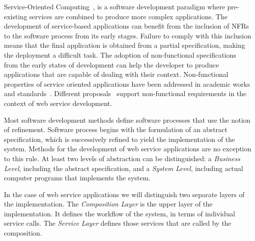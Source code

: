 {Service-Oriented Computing~\cite{Papazoglou2007}, is a software development paradigm where pre-existing services are combined to produce more complex applications. 
The development of service-based applications can benefit from the inclusion of NFRs to the software process from its early stages.
Failure to comply with this inclusion means that the final application is obtained from a partial specification, making the deployment a difficult task.
The adoption of non-functional specifications from the early states of development
can help the developer to produce applications that are capable of dealing with
their context.
Non-functional properties of service oriented applications have been
addressed in academic works and standards~\cite{ws-co,ws-tra,wsci}.
Different proposals~\cite{Babamir2010,AgarwalLS09,CholletL09,GutierrezRF10,XiaoCZBOLH08,JeongCL09,TsadimasNA12}
support non-functional requirements in the context of web service development. 

Most software development methods define software processes that use the notion of refinement.
Software process begins with the formulation of an abstract specification, which is successively refined to yield the implementation of the system.
Methods for the development of web service applications are no exception to this rule.
At least two levels of abstraction can be distinguished: a \textit{Business Level}, including the abstract specification, and a \textit{System Level}, including actual computer programs that implements the system.

In the case of web service applications we will distinguish two separate layers of the implementation.
The \textit{Composition Layer} is the upper layer of the implementation. 
It defines the workflow of the system, in terms of individual service calls.
The \textit{Service Layer} defines those services that are called by the composition.

}
